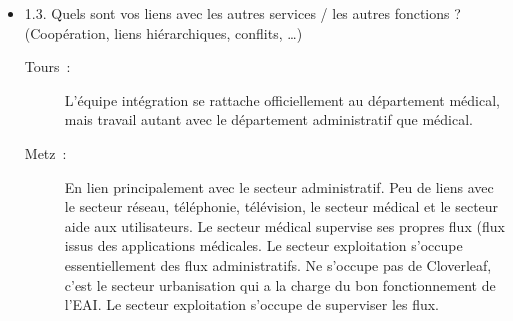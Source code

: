 \begin{itemize}
\begin{description}
\begin{figure}[H]
		\end{figure}
	  \end{description}
	  
	  \item 1.3. Quels sont vos liens avec les autres services / les autres
	  fonctions ? (Coopération, liens hiérarchiques, conflits, …)
	  \begin{description}
	  	\item[Tours~:] L’équipe intégration se rattache officiellement au
	  	département médical, mais travail autant avec le département administratif
	  	que médical.
	  	\item[Metz~:] En lien principalement avec le secteur administratif. Peu de
	  	liens avec le secteur réseau, téléphonie, télévision, le secteur médical et
	  	le secteur aide aux utilisateurs. Le secteur médical supervise ses propres
	  	flux (flux issus des applications médicales. Le secteur exploitation
	  	s’occupe essentiellement des flux administratifs. Ne s’occupe pas de
	  	Cloverleaf, c’est le secteur urbanisation qui a la charge du bon
	  	fonctionnement de l’EAI. Le secteur exploitation s’occupe de superviser les
	  	flux.
	  \end{description}
	\end{itemize}
	
